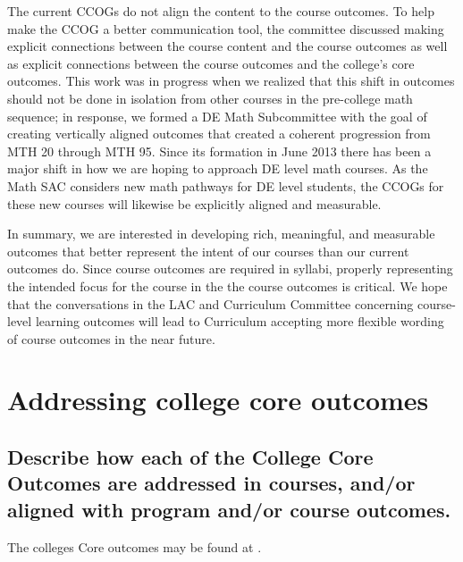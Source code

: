 The current CCOGs do not align the content to the course outcomes. To help
make the CCOG a better communication tool, the committee discussed making
explicit connections between the course content and the course outcomes as well
as explicit connections between the course outcomes and the college's core
outcomes.  This work was in progress when we realized that this shift in
outcomes should not be done in isolation from other courses in the pre-college
math sequence; in response, we formed a DE Math Subcommittee with the goal of
creating vertically aligned outcomes that created a coherent progression from
MTH 20 through MTH 95.  Since its formation in June 2013 there has been a major 
shift in how we are hoping to approach DE level math courses.  As the Math SAC
considers new math pathways for DE level students, the CCOGs for these new
courses will likewise be explicitly aligned and measurable.

In summary, we are interested in developing rich, meaningful, and measurable
outcomes that better represent the intent of our courses than our current
outcomes do. Since course outcomes are required in syllabi, properly
representing the intended focus for the course in the the course outcomes is
critical. We hope that the conversations in the LAC and Curriculum Committee
concerning course-level learning outcomes will lead to Curriculum accepting more
flexible wording of course outcomes in the near future.


\section{Addressing college core outcomes}

\subsection[Outcomes in courses and the math program]{Describe how each of the College Core Outcomes are addressed in courses, and/or aligned with program and/or course outcomes.}

The colleges Core outcomes may be found at \cite{coreoutcomes}.

